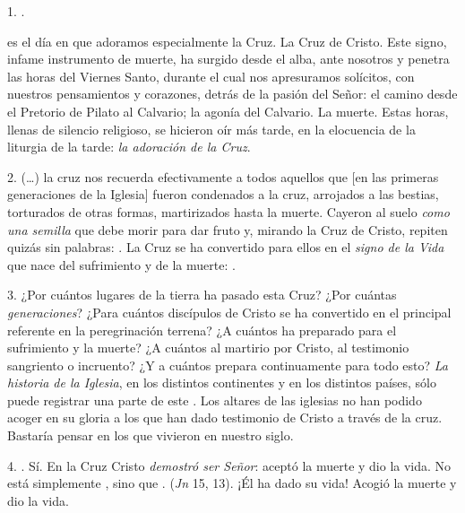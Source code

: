 \begin{body}
1. . 

 es el día en que adoramos especialmente la Cruz. La Cruz de Cristo. Este signo, infame instrumento de muerte, ha surgido desde el alba, ante nosotros y penetra las horas del Viernes Santo, durante el cual nos apresuramos solícitos, con nuestros pensamientos y corazones, detrás de la pasión del Señor: el camino desde el Pretorio de Pilato al Calvario; la agonía del Calvario. La muerte. Estas horas, llenas de silencio religioso, se hicieron oír más tarde, en la elocuencia de la liturgia de la tarde: \textit{la adoración de la Cruz}. 

2. (\ldots) la cruz nos recuerda efectivamente a todos aquellos que [en las primeras generaciones de la Iglesia] fueron condenados a la cruz, arrojados a las bestias, torturados de otras formas, martirizados hasta la muerte. Cayeron al suelo \textit{como una semilla} que debe morir para dar fruto y, mirando la Cruz de Cristo, repiten quizás sin palabras: . La Cruz se ha convertido para ellos en el \textit{signo de la Vida} que nace del sufrimiento y de la muerte: . 

3. ¿Por cuántos lugares de la tierra ha pasado esta Cruz? ¿Por cuántas \textit{generaciones}? ¿Para cuántos discípulos de Cristo se ha convertido en el principal referente en la peregrinación terrena? ¿A cuántos ha preparado para el sufrimiento y la muerte? ¿A cuántos al martirio por Cristo, al testimonio sangriento o incruento? ¿Y a cuántos prepara continuamente para todo esto? \textit{La historia de la Iglesia}, en los distintos continentes y en los distintos países, sólo puede registrar una parte de este . Los altares de las iglesias no han podido acoger en su gloria a los que han dado testimonio de Cristo a través de la cruz. Bastaría pensar en los que vivieron en nuestro siglo. 

4. . Sí. En la Cruz Cristo \textit{demostró ser Señor}: aceptó la muerte y dio la vida. No está simplemente , sino que .  (\textit{Jn} 15, 13). ¡Él ha dado su vida! Acogió la muerte y dio la vida. 


\end{body}
